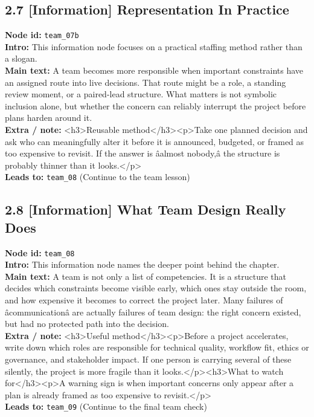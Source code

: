 \documentclass[11pt]{article}
\begin{document}
\subsection*{2.7 [Information] Representation In Practice}
\textbf{Node id:} \texttt{team\_07b}\\
\textbf{Intro:} This information node focuses on a practical staffing method rather than a slogan.\\
\textbf{Main text:} A team becomes more responsible when important constraints have an assigned route into live decisions. That route might be a role, a standing review moment, or a paired-lead structure. What matters is not symbolic inclusion alone, but whether the concern can reliably interrupt the project before plans harden around it.\\
\textbf{Extra / note:} <h3>Reusable method</h3><p>Take one planned decision and ask who can meaningfully alter it before it is announced, budgeted, or framed as too expensive to revisit. If the answer is âalmost nobody,â the structure is probably thinner than it looks.</p>\\
\textbf{Leads to:} \texttt{team\_08} (Continue to the team lesson)\\
\subsection*{2.8 [Information] What Team Design Really Does}
\textbf{Node id:} \texttt{team\_08}\\
\textbf{Intro:} This information node names the deeper point behind the chapter.\\
\textbf{Main text:} A team is not only a list of competencies. It is a structure that decides which constraints become visible early, which ones stay outside the room, and how expensive it becomes to correct the project later. Many failures of âcommunicationâ are actually failures of team design: the right concern existed, but had no protected path into the decision.\\
\textbf{Extra / note:} <h3>Useful method</h3><p>Before a project accelerates, write down which roles are responsible for technical quality, workflow fit, ethics or governance, and stakeholder impact. If one person is carrying several of these silently, the project is more fragile than it looks.</p><h3>What to watch for</h3><p>A warning sign is when important concerns only appear after a plan is already framed as too expensive to revisit.</p>\\
\textbf{Leads to:} \texttt{team\_09} (Continue to the final team check)\\
\end{document}
